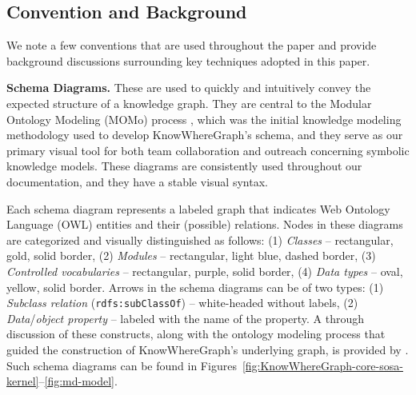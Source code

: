 
\subsection{Convention and Background}
\label{ssec:conv}
We note a few conventions that are used throughout the paper and provide background discussions surrounding key techniques adopted in this paper.

\textbf{Schema Diagrams.} These are used to quickly and intuitively convey the expected structure of a knowledge graph. They are central to the Modular Ontology Modeling (MOMo) process \citep{momo-swj}, which was the initial knowledge modeling methodology used to develop KnowWhereGraph's schema, and they serve as our primary visual tool for both team collaboration and outreach concerning symbolic knowledge models. These diagrams are consistently used throughout our documentation, and they have a stable visual syntax.

Each schema diagram represents a labeled graph that indicates Web Ontology Language (OWL) entities and their (possible) relations. Nodes in these diagrams are categorized and visually distinguished as follows: (1) \emph{Classes} -- rectangular, gold, solid border, (2) \emph{Modules} -- rectangular, light blue, dashed border, (3) \emph{Controlled vocabularies} -- rectangular, purple, solid border, (4) \emph{Data types} -- oval, yellow, solid border. Arrows in the schema diagrams can be of two types: (1) \emph{Subclass relation} (\texttt{rdfs:subClassOf}) -- white-headed without labels, (2) \emph{Data}/\emph{object property} -- labeled with the name of the property. A through discussion of these constructs, along with the ontology modeling process that guided the construction of KnowWhereGraph's underlying graph, is provided by \citet{kwg-jws,kwg-fois,momo-swj}. Such schema diagrams can be found in Figures~\ref{fig:KnowWhereGraph-core-sosa-kernel}--\ref{fig:md-model}.

